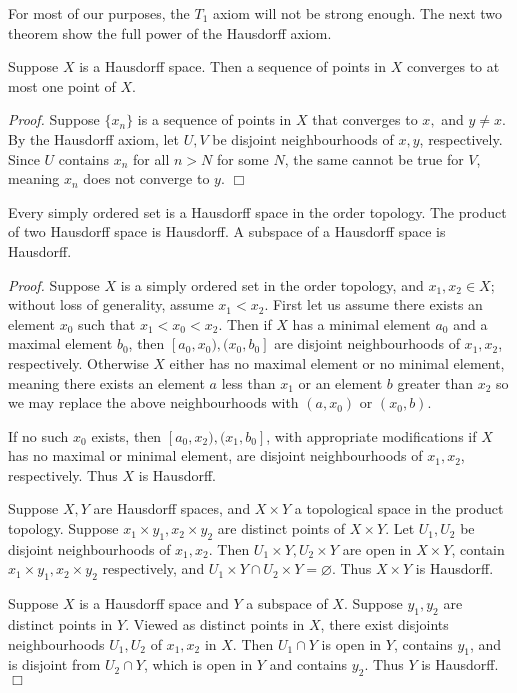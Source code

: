 For most of our purposes, the $T_1$ axiom will not be strong enough. The next two theorem show the full power of the Hausdorff axiom.
\begin{theorem}\label{2.32}
    Suppose $X$ is a Hausdorff space. Then a sequence of points in $X$ converges to at most one point of $X$.
\end{theorem}
{\it Proof.} Suppose $\{x_n\}$ is a sequence of points in $X$ that converges to $x,$ and $y \neq x$. By the Hausdorff axiom, let $U, V$ be disjoint neighbourhoods of $x, y$, respectively. Since $U$ contains $x_n$ for all $n > N$ for some $N$, the same cannot be true for $V$, meaning $x_n$ does not converge to $y$. $\Box$

\begin{theorem}\label{2.33}
    Every simply ordered set is a Hausdorff space in the order topology. The product of two Hausdorff space is Hausdorff. A subspace of a Hausdorff space is Hausdorff.
\end{theorem}
{\it Proof.} Suppose $X$ is a simply ordered set in the order topology, and $x_1, x_2 \in X$; without loss of generality, assume $x_1 < x_2$. First let us assume there exists an element $x_0$ such that $x_1 < x_0 < x_2$. Then if $X$ has a minimal element $a_0$ and a maximal element $b_0$, then $[a_0, x_0), (x_0, b_0]$ are disjoint neighbourhoods of $x_1, x_2$, respectively. Otherwise $X$ either has no maximal element or no minimal element, meaning there exists an element $a$ less than $x_1$ or an element $b$ greater than $x_2$ so we may replace the above neighbourhoods with $(a, x_0)$ or $(x_0, b)$.

If no such $x_0$ exists, then $[a_0, x_2), (x_1, b_0]$, with appropriate modifications if $X$ has no maximal or minimal element, are disjoint neighbourhoods of $x_1, x_2$, respectively. Thus $X$ is Hausdorff.

Suppose $X, Y$ are Hausdorff spaces, and $X \times Y$ a topological space in the product topology. Suppose $x_1 \times y_1, x_2 \times y_2$ are distinct points of $X \times Y$. Let $U_1, U_2$ be disjoint neighbourhoods of $x_1, x_2$. Then $U_1 \times Y, U_2 \times Y$ are open in $X \times Y$, contain $x_1 \times y_1, x_2 \times y_2$ respectively, and $U_1 \times Y \cap U_2 \times Y = \varnothing$. Thus $X \times Y$ is Hausdorff.

Suppose $X$ is a Hausdorff space and $Y$ a subspace of $X$. Suppose $y_1, y_2$ are distinct points in $Y$. Viewed as distinct points in $X$, there exist disjoints neighbourhoods $U_1, U_2$ of $x_1, x_2$ in $X$. Then $U_1 \cap Y$ is open in $Y$, contains $y_1$, and is disjoint from $U_2 \cap Y$, which is open in $Y$ and contains $y_2$. Thus $Y$ is Hausdorff. $\Box$

